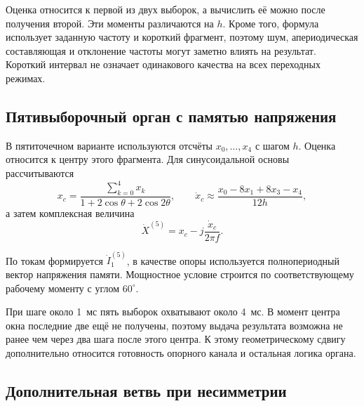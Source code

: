 Оценка относится к первой
из двух выборок,
а вычислить её можно
после получения второй.
Эти моменты различаются на $h$.
Кроме того, формула использует
заданную частоту и короткий фрагмент,
поэтому шум, апериодическая
составляющая и отклонение частоты
могут заметно влиять на результат.
Короткий интервал не означает
одинакового качества
на всех переходных режимах.

{}


\subsection{Пятивыборочный орган с памятью напряжения}
\label{sec:ch5_five_sample}

В пятиточечном варианте
используются отсчёты
$x_0,\ldots,x_4$ с шагом $h$.
Оценка относится к центру
этого фрагмента.
Для синусоидальной основы
рассчитываются
\begin{equation}
 x_c=\frac{\sum_{k=0}^4x_k}
 {1+2\cos\theta+2\cos2\theta},
 \qquad
 \dot{x}_c\approx
 \frac{x_0-8x_1+8x_3-x_4}{12h},
 \label{eq:ch5_five_sample_derivative}
\end{equation}
а затем комплексная величина
\begin{equation}
 \dot{X}^{(5)}=x_c-j\frac{\dot{x}_c}{2\pi f}.
 \label{eq:ch5_five_sample_vector}
\end{equation}

По токам формируется
$\dot{I}_1^{(5)}$,
в качестве опоры используется
полнопериодный вектор
напряжения памяти.
Мощностное условие строится
по соответствующему рабочему моменту
с углом $60^\circ$.

При шаге около 1~мс
пять выборок охватывают около 4~мс.
В момент центра окна
последние две ещё не получены,
поэтому выдача результата
возможна не ранее чем через
два шага после этого центра.
К этому геометрическому сдвигу
дополнительно относится
готовность опорного канала
и остальная логика органа.

{}

\subsection{Дополнительная ветвь при несимметрии}
\label{sec:ch5_unbalance_branch}

